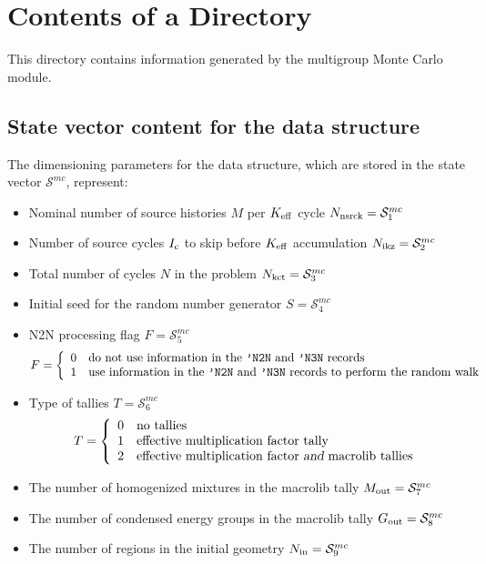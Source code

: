 \section{Contents of a  Directory}\label{sect:mcdir}

This directory contains information generated by the  multigroup Monte Carlo
module.

\subsection{State vector content for the  data structure}\label{sect:mcstate}

The dimensioning parameters for the  data structure, which are stored in
the state vector $\mathcal{S}^{mc}$, represent:

\begin{itemize}
\item Nominal number of source histories $M$ per $K_{\rm eff}$ cycle $N_{\rm nsrck}=\mathcal{S}^{mc}_{1}$
\item Number of source cycles $I_{\rm c}$ to skip before $K_{\rm eff}$ accumulation $N_{\rm ikz}=\mathcal{S}^{mc}_{2}$
\item Total number of cycles $N$ in the problem $N_{\rm kct}=\mathcal{S}^{mc}_{3}$
\item Initial seed for the random number generator $S=\mathcal{S}^{mc}_{4}$
\item N2N processing flag $F=\mathcal{S}^{mc}_{5}$
\begin{displaymath}
F = \left\{
\begin{array}{ll}
0 & \textrm{do not use information in the {\tt 'N2N} and {\tt 'N3N} records} \\
1 & \textrm{use information in the {\tt 'N2N} and {\tt 'N3N} records to perform
the random walk}
\end{array} \right.
\end{displaymath}
\item Type of tallies $T=\mathcal{S}^{mc}_{6}$
\begin{displaymath}
T = \left\{
\begin{array}{ll}
0 & \textrm{no tallies} \\
1 & \textrm{effective multiplication factor tally} \\
2 & \textrm{effective multiplication factor {\sl and} macrolib tallies}
\end{array} \right.
\end{displaymath}
\item The number of homogenized mixtures in the macrolib tally ${M_{\rm out}}=\mathcal{S}^{mc}_{7}$ 
\item The number of condensed energy groups in the macrolib tally ${G_{\rm out}}=\mathcal{S}^{mc}_{8}$ 
\item The number of regions in the initial geometry ${N_{\rm in}}=\mathcal{S}^{mc}_{9}$ 
\end{itemize}

